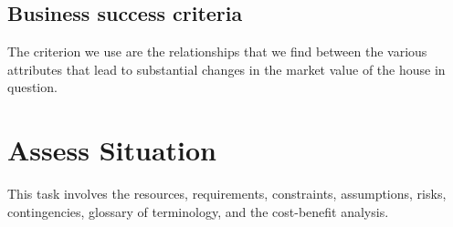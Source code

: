 \subsection{Business success criteria}
The criterion we use are the relationships that we find between the various attributes that lead to substantial changes in the market value of the house in question.

\section{Assess Situation}
This task involves the resources, requirements, constraints, assumptions, risks, contingencies, glossary of terminology, and the cost-benefit analysis.

